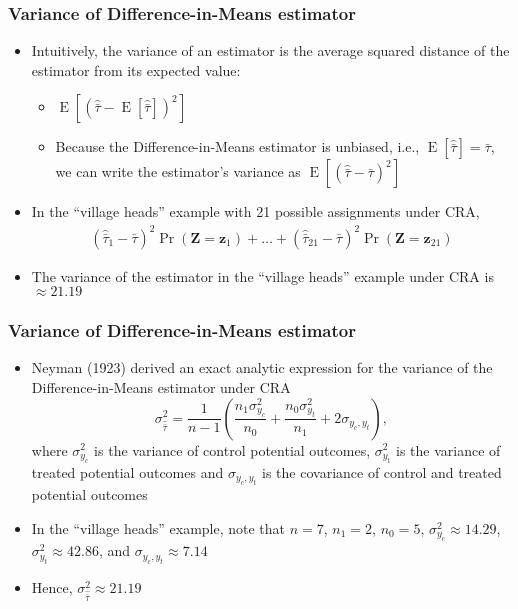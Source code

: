 \documentclass[table, xcolor={dvipsnames}, 9pt]{beamer}
\theoremstyle{newstyle}
\DeclareMathOperator{\E}{\mathrm{E}}
\begin{document}
\begin{frame}
\frametitle{Variance of Difference-in-Means estimator} 
\begin{itemize}
\item Intuitively, the variance of an estimator is the average squared distance of the estimator from its expected value: \pause 
\begin{itemize}
\item $\E\left[\left(\hat{\bar{\tau}} - \E\left[\hat{\bar{\tau}}\right]\right)^2\right]$ \pause 
\item Because the Difference-in-Means estimator is unbiased, i.e., $\E\left[\hat{\bar{\tau}}\right] = \bar{\tau}$, we can write the estimator's variance as $\E\left[\left(\hat{\bar{\tau}} - \bar{\tau}\right)^2\right]$
\end{itemize} \pause 
\item In the ``village heads'' example with 21 possible assignments under CRA, \pause 
\begin{align*}
\left(\hat{\bar{\tau}}_{1} - \bar{\tau}\right)^2 \Pr\left(\mathbf{Z} = \mathbf{z}_1\right) + \ldots + \left(\hat{\bar{\tau}}_{21} - \bar{\tau}\right)^2 \Pr\left(\mathbf{Z} = \mathbf{z}_{21}\right)
\end{align*} \pause 
\item The variance of the estimator in the ``village heads'' example under CRA is $\approx 21.19$
\end{itemize}
\end{frame}
\begin{frame}
\frametitle{Variance of Difference-in-Means estimator}
\begin{itemize}
\item Neyman (1923) derived an exact analytic expression for the variance of the Difference-in-Means estimator under CRA \pause 
\begin{equation}
\sigma^2_{\hat{\bar{\tau}}} = \frac{1}{n - 1}\left(\frac{n_1 \sigma^2_{y_c}}{n_0} + \frac{n_0 \sigma^2_{y_t}}{n_1} + 2\sigma_{y_c, y_t}\right),
\end{equation} \pause 
where $\sigma^2_{y_c}$ is the variance of control potential outcomes, \pause $\sigma^2_{y_t}$ is the variance of treated potential outcomes and \pause $\sigma_{y_c, y_t}$ is the covariance of control and treated potential outcomes \pause
\item In the ``village heads'' example, note that $n = 7$, $n_1 = 2$, $n_0 = 5$, $\sigma^2_{y_c} \approx 14.29$,  $\sigma^2_{y_t} \approx 42.86$, and $\sigma_{y_c, y_t} \approx 7.14$ \pause 
\item Hence, $\sigma^2_{\hat{\bar{\tau}}} \approx 21.19$
\end{itemize}
\end{frame}
\end{document}
